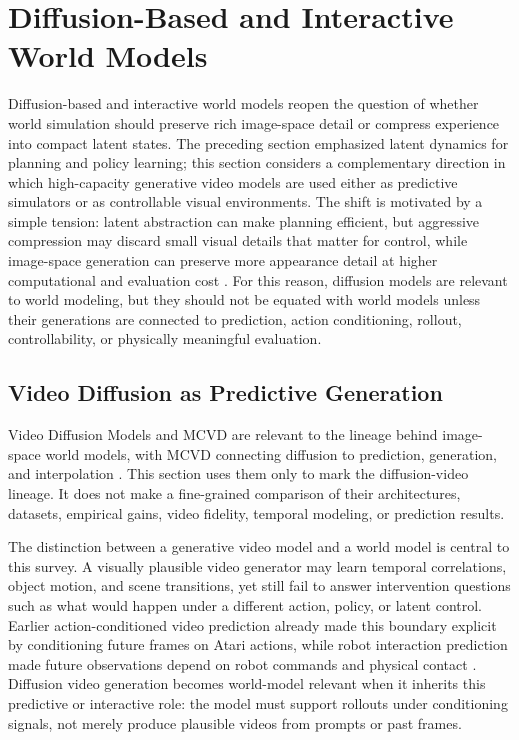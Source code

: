 \section{Diffusion-Based and Interactive World Models}
\label{sec:diffusion_interactive_world_models}

Diffusion-based and interactive world models reopen the question of whether world simulation should preserve rich image-space detail or compress experience into compact latent states. The preceding section emphasized latent dynamics for planning and policy learning; this section considers a complementary direction in which high-capacity generative video models are used either as predictive simulators or as controllable visual environments. The shift is motivated by a simple tension: latent abstraction can make planning efficient, but aggressive compression may discard small visual details that matter for control, while image-space generation can preserve more appearance detail at higher computational and evaluation cost \cite{hafner2019_planet_prov,hafner2020_dreamer_prov,alonso2024_diamond_prov}. For this reason, diffusion models are relevant to world modeling, but they should not be equated with world models unless their generations are connected to prediction, action conditioning, rollout, controllability, or physically meaningful evaluation.

\subsection{Video Diffusion as Predictive Generation}

Video Diffusion Models and MCVD are relevant to the lineage behind image-space world models, with MCVD connecting diffusion to prediction, generation, and interpolation \cite{ho2022_video_diffusion_models_prov,voleti2022_mcvd_prov}. This section uses them only to mark the diffusion-video lineage. It does not make a fine-grained comparison of their architectures, datasets, empirical gains, video fidelity, temporal modeling, or prediction results.

The distinction between a generative video model and a world model is central to this survey. A visually plausible video generator may learn temporal correlations, object motion, and scene transitions, yet still fail to answer intervention questions such as what would happen under a different action, policy, or latent control. Earlier action-conditioned video prediction already made this boundary explicit by conditioning future frames on Atari actions, while robot interaction prediction made future observations depend on robot commands and physical contact \cite{oh2015_action_conditional_video_prediction_prov,finn2016_physical_interaction_video_prediction_prov}. Diffusion video generation becomes world-model relevant when it inherits this predictive or interactive role: the model must support rollouts under conditioning signals, not merely produce plausible videos from prompts or past frames.

